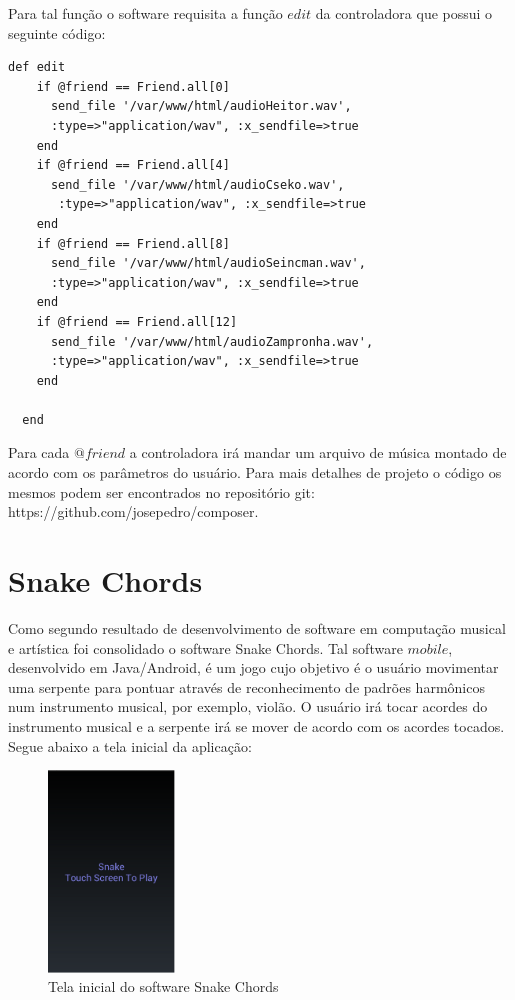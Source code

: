 Para tal função o software requisita a função $edit$ da controladora que possui o seguinte código:
\begin{lstlisting}
def edit
    if @friend == Friend.all[0]
      send_file '/var/www/html/audioHeitor.wav', 
      :type=>"application/wav", :x_sendfile=>true  
    end
    if @friend == Friend.all[4]
      send_file '/var/www/html/audioCseko.wav',
       :type=>"application/wav", :x_sendfile=>true  
    end
    if @friend == Friend.all[8]
      send_file '/var/www/html/audioSeincman.wav', 
      :type=>"application/wav", :x_sendfile=>true  
    end
    if @friend == Friend.all[12]
      send_file '/var/www/html/audioZampronha.wav', 
      :type=>"application/wav", :x_sendfile=>true  
    end
    
  end
\end{lstlisting}

Para cada $@friend$ a controladora irá mandar um arquivo de música montado de acordo com os parâmetros do usuário. Para mais detalhes de projeto o código os mesmos podem ser encontrados no repositório git: https://github.com/josepedro/composer.

\section{Snake Chords}

Como segundo resultado de desenvolvimento de software em computação musical e artística foi consolidado o software Snake Chords. Tal software $mobile$, desenvolvido em Java/Android, é um jogo cujo objetivo é o usuário movimentar uma serpente para pontuar através de reconhecimento de padrões harmônicos num instrumento musical, por exemplo, violão. O usuário irá tocar acordes do instrumento musical e a serpente irá se mover de acordo com os acordes tocados. Segue abaixo a tela inicial da aplicação:

\begin{figure}[h!]
        \centering
        \includegraphics[width=0.3\textwidth]{figuras/snake_1.eps}
        \caption{Tela inicial do software Snake Chords}
        \label{fig:cronograma}
\end{figure}


